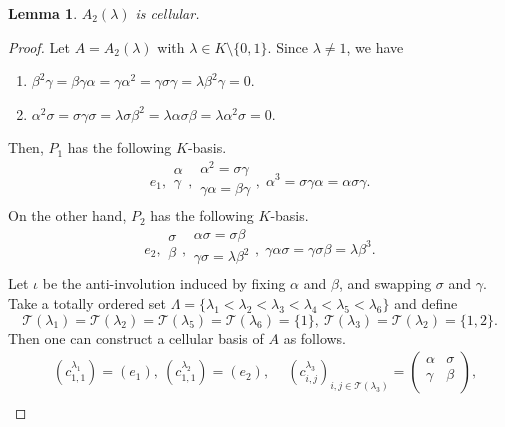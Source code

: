 \documentclass[12pt]{amsart}
\newtheorem{lem}[thm]{Lemma}
\numberwithin{equation}{thm}
\newcommand\cT{\mathcal{T}}
\newcommand\la{\lambda}
\begin{document}
{\begin{lem}
\label{P A2}
$A_2(\lambda)$ is cellular.
\end{lem}
\begin{proof}
Let $A=A_2(\lambda)$ with $\lambda\in K\setminus\{0,1\}$.
Since $\lambda\neq 1$, we have 
\begin{enumerate}
\item $\beta^2\gamma=\beta\gamma\alpha=\gamma\alpha^2=\gamma\sigma\gamma=\lambda\beta^2\gamma=0.$
\item $\alpha^2\sigma=\sigma\gamma\sigma=\lambda\sigma\beta^2=
\lambda\alpha\sigma\beta=\lambda\alpha^2\sigma=0.$
\end{enumerate}
Then, $P_1$ has the following $K$-basis.
\[e_1, 
\begin{array}{cc}
 \alpha\\
 \gamma\\
\end{array},
\begin{array}{cc}
 \alpha^2=\sigma\gamma\\
 \gamma\alpha=\beta\gamma\\
\end{array},\;
\alpha^3=\sigma\gamma\alpha=\alpha\sigma\gamma.
  \]
On the other hand, $P_2$ has the following $K$-basis.
\[e_2, 
\begin{array}{cc}
 \sigma\\
 \beta\\
\end{array},
\begin{array}{cc}
 \alpha\sigma=\sigma\beta\\
 \gamma\sigma=\lambda\beta^2\\
\end{array},\;
\gamma\alpha\sigma=\gamma\sigma\beta=\lambda\beta^3.
  \]
Let $\iota$ be the anti-involution induced by fixing $\alpha$ and $\beta$, and swapping 
$\sigma$ and $\gamma$. Take a totally ordered set
 $\Lambda=\{\lambda_1<\lambda_2<\lambda_3<\lambda_4<\lambda_5<\lambda_6\}$ 
and define
\[\cT(\lambda_1)=\cT(\lambda_2)=\cT(\lambda_5)=\cT(\lambda_6)=\{1\},\ 
\cT(\lambda_3)=\cT(\lambda_2)=\{1,2\}.\]
Then one can construct a cellular basis of $A$ as follows.
\begin{align*}
& (c_{1,1}^{\lambda_1})=(e_1),\
 (c_{1,1}^{\lambda_2})=(e_2),\quad \  
(c_{i,j}^{\lambda_3})_{i,j\in \cT(\la_3)}
    =\begin{pmatrix}
    \alpha & \sigma \\
    \gamma & \beta \\
    \end{pmatrix},\\[7pt] 

\end{align*}
\end{proof}}
\end{document}
